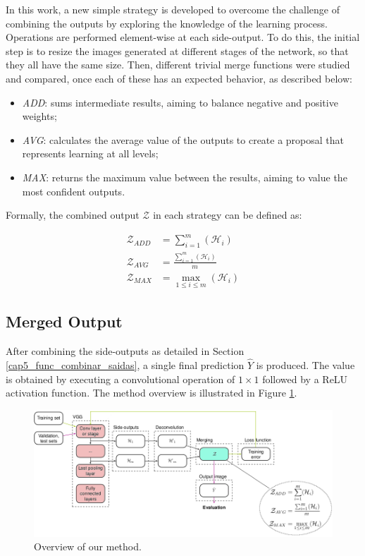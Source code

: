 In this work, a new simple strategy is developed to overcome the challenge of combining the outputs by exploring the knowledge of the learning process.
Operations are performed element-wise at each side-output.
To do this, the initial step is to resize the images generated at different stages of the network, so that they all have the same size.
Then, different trivial merge functions were studied and compared, once each of these has an expected behavior, as described below:

\begin{itemize}
  \item \textit{ADD}: sums intermediate results, aiming to balance negative and positive weights;
  \item \textit{AVG}: calculates the average value of the outputs to create a proposal that represents learning at all levels;
  \item \textit{MAX}: returns the maximum value between the results, aiming to value the most confident outputs.
\end{itemize}

Formally, the combined output $\mathcal{Z}$ in each strategy can be defined as:

\begin{align}
  \mathcal{Z}_{ADD} &= \sum_{i=1}^{m}(\mathcal{H}_i)\\
  \mathcal{Z}_{AVG} &= \frac{\sum_{i=1}^{m}(\mathcal{H}_i)}{m}\\
  \mathcal{Z}_{MAX} &= \max_{1 \leq i \leq m} (\mathcal{H}_i)
\end{align} 

\subsection{Merged Output}
\label{cap5_saida_final_rede}

After combining the side-outputs as detailed in Section \ref{cap5_func_combinar_saidas}, a single final prediction $\hat{Y}$ is produced.
The value is obtained by executing a convolutional operation of $1 \times 1$ followed by a ReLU activation function.
The method overview is illustrated in Figure \ref{fig:method}.

\begin{figure}
  \centering
  \includegraphics[width=1\textwidth]{../imagens/ilustracoes/cap5_metodo.png} %
  \caption{Overview of our method.}
  \label{fig:method}
\end{figure}

